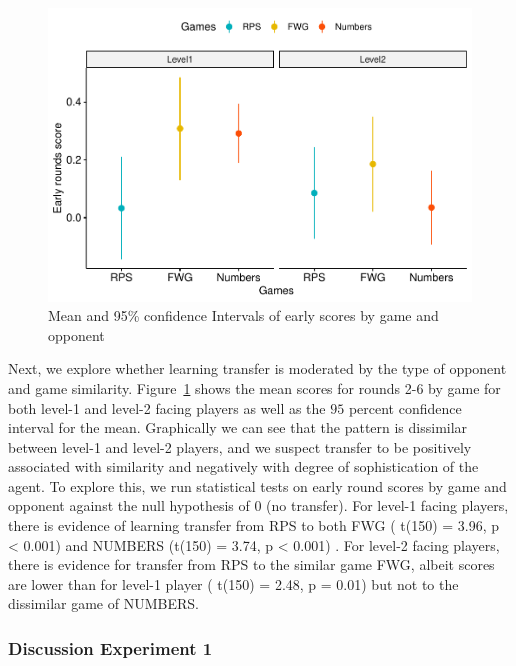 \documentclass[man,floatsintext]{apa6}
\begin{document}
\begin{figure}

{\centering \includegraphics{draft_upgrade_v1_files/figure-latex/exp1-score-by-opp-1} 

}

\caption{Mean and 95\% confidence Intervals of early scores by game and opponent}\label{fig:exp1-score-by-opp}
\end{figure}

Next, we explore whether learning transfer is moderated by the type of opponent and game similarity. Figure~\ref{fig:exp1-score-by-opp} shows the mean scores for rounds 2-6 by game for both level-1 and level-2 facing players as well as the \(95\) percent confidence interval for the mean. Graphically we can see that the pattern is dissimilar between level-1 and level-2 players, and we suspect transfer to be positively associated with similarity and negatively with degree of sophistication of the agent. To explore this, we run statistical tests on early round scores by game and opponent against the null hypothesis of 0 (no transfer). For level-1 facing players, there is evidence of learning transfer from RPS to both FWG ( t(150) = 3.96, p \textless{} 0.001) and NUMBERS (t(150) = 3.74, p \textless{} 0.001) . For level-2 facing players, there is evidence for transfer from RPS to the similar game FWG, albeit scores are lower than for level-1 player ( t(150) = 2.48, p = 0.01) but not to the dissimilar game of NUMBERS.

\hypertarget{discussion-experiment-1}{%
\subsubsection{Discussion Experiment 1}\label{discussion-experiment-1}}
\end{document}
